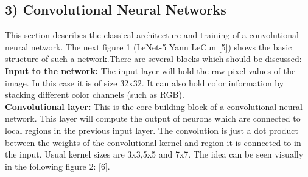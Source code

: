 \documentclass[a4paper]{article}
\begin{document}
\subsection*{3) Convolutional Neural Networks}
\begin{justify}

This section describes the classical architecture and training of a convolutional neural network. The next figure 1 (LeNet-5 Yann LeCun [5]) shows the basic structure of such a network.There are several blocks which should be discussed:
\newline
\\
\textbf{Input to the network:} The input layer will hold the raw pixel values of the image. In this case it is of size 32x32. It can also hold color information by stacking different color channels (such as RGB).
\newline
\\
\textbf{Convolutional layer:} This is the core building block of a convolutional neural network. This layer will compute the output of neurons which are connected to local regions in the previous input layer.
The convolution is just a dot product between the weights of the convolutional kernel and region it is connected to in the input. Usual kernel sizes are 3x3,5x5 and 7x7. The idea can be seen visually in the following figure 2: [6].
   	\begin{tcolorbox}
   		\begin{figure}[H]
   			\begin{center}
   			\end{center}
   		\end{figure}
   	\end{tcolorbox}


\end{justify}
\end{document}
